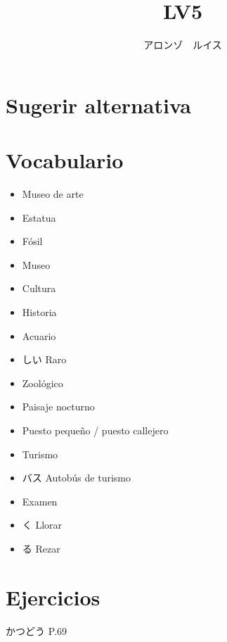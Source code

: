 \documentclass[a4paper,lualatex,ja=standard,base=10pt]{bxjsarticle}
\title{\ruby{第|０８|課}{だい||か} LV5}
\author{アロンゾ　ルイス}
\begin{document}
\setcounter{page}{1}

\maketitle{}
\thispagestyle{fancy}

\section{Sugerir alternativa}

\section{Vocabulario}

\begin{itemize}
  \item {} Museo de arte
  \item {} Estatua
  \item {} Fósil
  \item {} Museo
  \item {} Cultura
  \item {} Historia
  \item {} Acuario
  \item {}しい Raro
  \item {} Zoológico
  \item {} Paisaje nocturno
  \item {} Puesto pequeño / puesto callejero
  \item {} Turismo
  \item {}バス Autobús de turismo
  \item {} Examen
  \item {}く Llorar
  \item {}る Rezar
\end{itemize}

\section{Ejercicios}

かつどう P.69
\end{document}
